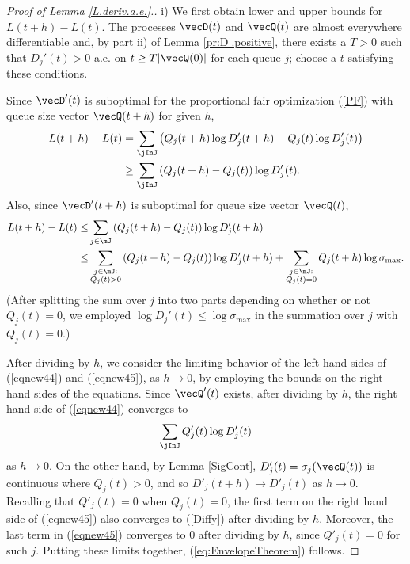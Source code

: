 \documentclass{amsart}
\begin{document}
\begin{proof}[Proof of Lemma \ref{L.deriv.a.e.}.]
i)  We first obtain lower and upper bounds for  $L(t+h) - L(t)$.
The processes $\vecD(t)$ and $\vecQ(t)$ are almost everywhere differentiable and,  by part ii) of Lemma \ref{pr:D'.positive}, there exists a $T>0$ such that $D_j'(t) >0$ a.e. on $t \geq T|\vecQ(0)|$ for each queue $j$; choose a $t$ satisfying these conditions.
\iffalse
From \eqref{def:entropy}, $H(t)$ admits derivative as soon as the term 
\begin{equation}
L(t) = \sum_{j\in\mJ} Q_j(t) \log D'_j(t)
\end{equation}
does.
\fi
Since $\vecD'(t)$ is suboptimal for the proportional fair optimization (\ref{PF}) with queue size vector $\vecQ(t+h)$ for given $h$,
\begin{equation}
\label{eqnew44}
\begin{split}
L(t+h) - L(t) &= \sum_\jInJ \left(Q_j(t+h)\log D'_j(t+h)-Q_j(t)  \log D'_j(t)\right) \\
&\geq \sum_\jInJ \left(Q_j(t+h)-Q_j(t)\right)  \log D'_j(t).  
\end{split}
\end{equation}
Also, since $\vecD'(t+h)$ is suboptimal for queue size vector $\vecQ(t)$, 
\begin{equation}
\label{eqnew45}
\begin{split}
L(t+h) - L(t) 
\leq  & \sum_{j\in\mJ} \left(Q_j(t+h)-Q_j(t)\right)  \log D'_j(t+h) \\
\leq  & \sum_{\substack{j\in\mJ:\\ Q_j(t) >0}} \left(Q_j(t+h)-Q_j(t)\right)  
\log D'_j(t+h) +\sum_{\substack{j\in\mJ:\\ Q_j(t) =0}} Q_j(t+h)
\log \sigma_{\max} .
\end{split}
\end{equation}
(After splitting the sum over $j$ into two parts depending on whether or not $Q_j(t)=0$, we employed $\log D_j'(t) \leq \log \sigma_{\max}$ in the summation over $j$ with $Q_j(t)=0$.)

After dividing by $h$, we consider the limiting behavior of the left hand sides of (\ref{eqnew44}) and (\ref{eqnew45}), as $h\rightarrow 0$, by employing the bounds on the right hand sides of the equations.
Since $\vecQ'(t)$ exists, after dividing by $h$, the right hand side of  (\ref{eqnew44}) converges to
\begin{equation}\label{Diffy}
\sum_\jInJ Q'_j(t) \log D'_j(t) 
\end{equation}
as  $h\rightarrow 0$. On the other hand,  by Lemma \ref{SigCont},  $D'_j(t)=\sigma_j(\vecQ(t))$ is continuous where $Q_j(t)>0$, and so $D'_j(t+h) \rightarrow D'_j(t)$ as $h\rightarrow 0$. Recalling that $Q'_j(t)=0$ when $Q_j(t)=0$, the first term on the right hand side of (\ref{eqnew45}) also converges to (\ref{Diffy}) after dividing by $h$. 
Moreover, the last term in (\ref{eqnew45}) converges to $0$ after dividing by $h$, since
$Q'_j(t)=0$ for such $j$.  Putting these limits together, (\ref{eq:EnvelopeTheorem}) follows.


\end{proof}
\end{document}
